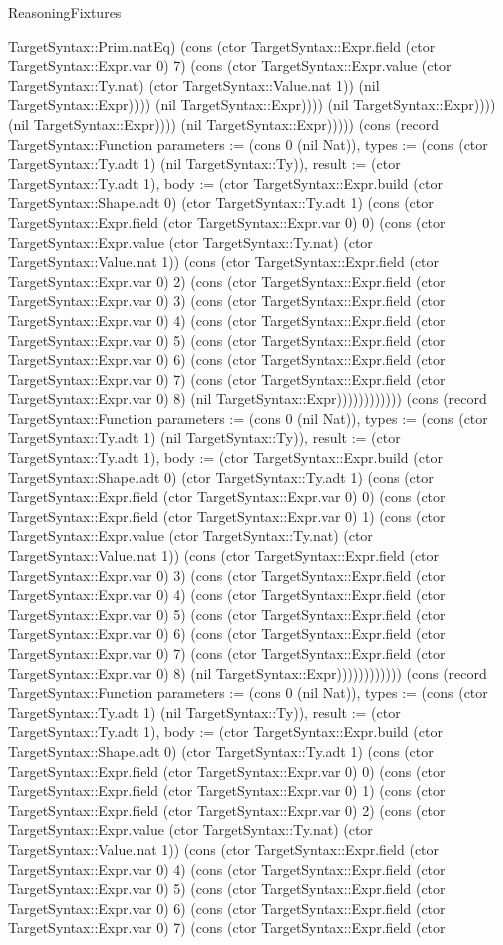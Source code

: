 \begin{lexlean}{ReasoningFixtures}
\begin{semanticmodule}
{TargetSyntax::Prim.natEq) (cons (ctor TargetSyntax::Expr.field (ctor TargetSyntax::Expr.var 0) 7) (cons (ctor TargetSyntax::Expr.value (ctor TargetSyntax::Ty.nat) (ctor TargetSyntax::Value.nat 1)) (nil TargetSyntax::Expr)))) (nil TargetSyntax::Expr)))) (nil TargetSyntax::Expr)))) (nil TargetSyntax::Expr)))) (nil TargetSyntax::Expr))))}) (cons (record TargetSyntax::Function {parameters := (cons 0 (nil Nat)), types := (cons (ctor TargetSyntax::Ty.adt 1) (nil TargetSyntax::Ty)), result := (ctor TargetSyntax::Ty.adt 1), body := (ctor TargetSyntax::Expr.build (ctor TargetSyntax::Shape.adt 0) (ctor TargetSyntax::Ty.adt 1) (cons (ctor TargetSyntax::Expr.field (ctor TargetSyntax::Expr.var 0) 0) (cons (ctor TargetSyntax::Expr.value (ctor TargetSyntax::Ty.nat) (ctor TargetSyntax::Value.nat 1)) (cons (ctor TargetSyntax::Expr.field (ctor TargetSyntax::Expr.var 0) 2) (cons (ctor TargetSyntax::Expr.field (ctor TargetSyntax::Expr.var 0) 3) (cons (ctor TargetSyntax::Expr.field (ctor TargetSyntax::Expr.var 0) 4) (cons (ctor TargetSyntax::Expr.field (ctor TargetSyntax::Expr.var 0) 5) (cons (ctor TargetSyntax::Expr.field (ctor TargetSyntax::Expr.var 0) 6) (cons (ctor TargetSyntax::Expr.field (ctor TargetSyntax::Expr.var 0) 7) (cons (ctor TargetSyntax::Expr.field (ctor TargetSyntax::Expr.var 0) 8) (nil TargetSyntax::Expr)))))))))))}) (cons (record TargetSyntax::Function {parameters := (cons 0 (nil Nat)), types := (cons (ctor TargetSyntax::Ty.adt 1) (nil TargetSyntax::Ty)), result := (ctor TargetSyntax::Ty.adt 1), body := (ctor TargetSyntax::Expr.build (ctor TargetSyntax::Shape.adt 0) (ctor TargetSyntax::Ty.adt 1) (cons (ctor TargetSyntax::Expr.field (ctor TargetSyntax::Expr.var 0) 0) (cons (ctor TargetSyntax::Expr.field (ctor TargetSyntax::Expr.var 0) 1) (cons (ctor TargetSyntax::Expr.value (ctor TargetSyntax::Ty.nat) (ctor TargetSyntax::Value.nat 1)) (cons (ctor TargetSyntax::Expr.field (ctor TargetSyntax::Expr.var 0) 3) (cons (ctor TargetSyntax::Expr.field (ctor TargetSyntax::Expr.var 0) 4) (cons (ctor TargetSyntax::Expr.field (ctor TargetSyntax::Expr.var 0) 5) (cons (ctor TargetSyntax::Expr.field (ctor TargetSyntax::Expr.var 0) 6) (cons (ctor TargetSyntax::Expr.field (ctor TargetSyntax::Expr.var 0) 7) (cons (ctor TargetSyntax::Expr.field (ctor TargetSyntax::Expr.var 0) 8) (nil TargetSyntax::Expr)))))))))))}) (cons (record TargetSyntax::Function {parameters := (cons 0 (nil Nat)), types := (cons (ctor TargetSyntax::Ty.adt 1) (nil TargetSyntax::Ty)), result := (ctor TargetSyntax::Ty.adt 1), body := (ctor TargetSyntax::Expr.build (ctor TargetSyntax::Shape.adt 0) (ctor TargetSyntax::Ty.adt 1) (cons (ctor TargetSyntax::Expr.field (ctor TargetSyntax::Expr.var 0) 0) (cons (ctor TargetSyntax::Expr.field (ctor TargetSyntax::Expr.var 0) 1) (cons (ctor TargetSyntax::Expr.field (ctor TargetSyntax::Expr.var 0) 2) (cons (ctor TargetSyntax::Expr.value (ctor TargetSyntax::Ty.nat) (ctor TargetSyntax::Value.nat 1)) (cons (ctor TargetSyntax::Expr.field (ctor TargetSyntax::Expr.var 0) 4) (cons (ctor TargetSyntax::Expr.field (ctor TargetSyntax::Expr.var 0) 5) (cons (ctor TargetSyntax::Expr.field (ctor TargetSyntax::Expr.var 0) 6) (cons (ctor TargetSyntax::Expr.field (ctor TargetSyntax::Expr.var 0) 7) (cons (ctor TargetSyntax::Expr.field (ctor }
\end{semanticmodule}
\end{lexlean}
